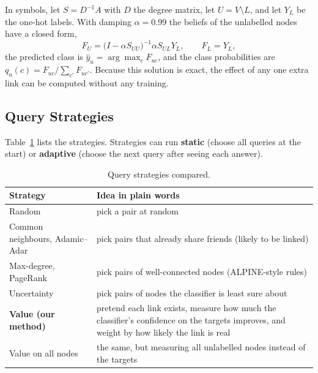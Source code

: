 \documentclass[11pt,a4paper]{article}
\begin{document}
In symbols, let $S=D^{-1}A$ with $D$ the degree matrix, let $U=V\setminus L$, and let $Y_L$ be
the one-hot labels. With damping $\alpha=0.99$ the beliefs of the unlabelled nodes have a
closed form,
\begin{equation}
F_U=\bigl(I-\alpha S_{UU}\bigr)^{-1}\alpha S_{UL}Y_L,\qquad F_L=Y_L,
\end{equation}
the predicted class is $\hat y_u=\arg\max_c F_{uc}$, and the class probabilities are
$q_u(c)=F_{uc}/\sum_{c'}F_{uc'}$. Because this solution is exact, the effect of any one extra
link can be computed without any training.

\subsection{Query Strategies}
Table~\ref{tab:strategies} lists the strategies. Strategies can run \textbf{static} (choose
all queries at the start) or \textbf{adaptive} (choose the next query after seeing each
answer).

\begin{table}[htbp]
\centering
\caption{Query strategies compared.}
\label{tab:strategies}
\begin{tabularx}{\textwidth}{lX}
\toprule
Strategy & Idea in plain words\\
\midrule
Random & pick a pair at random\\
Common neighbours, Adamic--Adar~\cite{adamic} & pick pairs that already share friends (likely to be linked)\\
Max-degree, PageRank & pick pairs of well-connected nodes (ALPINE-style rules)\\
Uncertainty & pick pairs of nodes the classifier is least sure about\\
\textbf{Value (our method)} & pretend each link exists, measure how much the classifier's confidence on the targets improves, and weight by how likely the link is real\\
Value on all nodes & the same, but measuring all unlabelled nodes instead of the targets\\
\bottomrule
\end{tabularx}
\end{table}
\end{document}
